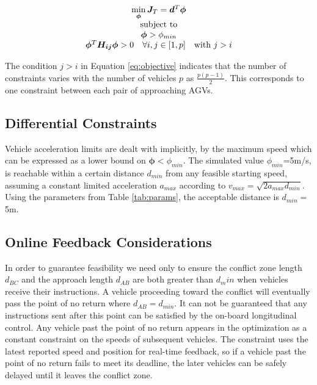 \begin{equation}
\label{eq:objective}
\begin{array}{c}
\min \limits_{\bm{\phi}} \bm{J}_T = \bm{d}^T\bm{\phi} \\ 
$subject to$\\
\bm{\phi} > \phi_{min} \\
\bm{\phi}^T \bm{H_{ij}} \bm{\phi} > 0 \quad \forall i, j \in [1,p] \quad $with $ j > i \\
\end{array}
\end{equation}

The condition $j > i$ in Equation \ref{eq:objective} indicates that the number of constraints varies with the number of vehicles $p$ as $\frac{p(p-1)}{2}$. This corresponds to one constraint between each pair of approaching AGVs.

\subsection{Differential Constraints}
Vehicle acceleration limits are dealt with implicitly, by the maximum speed which can be expressed as a lower bound on $\bm{\phi} < \phi_{min}$. The simulated value $\phi_{min}$=5m/s, is reachable within a certain distance $d_{min}$ from any feasible starting speed, assuming a constant limited acceleration $a_{max}$ according to $v_{max} = \sqrt{2 a_{max} d_{min}} $. Using the parameters from Table \ref{tab:params}, the acceptable distance is $d_{min}=$5m.

\subsection{Online Feedback Considerations}
In order to guarantee feasibility we need only to ensure the conflict zone length $d_{BC}$ and the approach length $d_{AB}$ are both greater than $d_min$ when vehicles receive their instructions. A vehicle proceeding toward the conflict will eventually pass the point of no return where $d_{AB} = d_{min}$. It can not be guaranteed that any instructions sent after this point can be satisfied by the on-board longitudinal control. Any vehicle past the point of no return appears in the optimization as a constant constraint on the speeds of subsequent vehicles. The constraint uses the latest reported speed and position for real-time feedback, so if a vehicle past the point of no return fails to meet its deadline, the later vehicles can be safely delayed until it leaves the conflict zone.  

